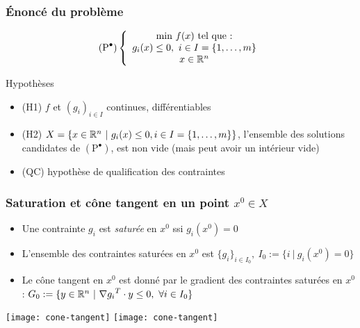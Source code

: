 \documentclass{beamer}
\newcommand{\R}{{\ensuremath\mathbb{R}}}
\begin{document}
\begin{frame}
  \frametitle{\'Enoncé du problème}

  \[
  (\text{P}^\bullet) \left\{
  \begin{array}{c}
    \text{min} \ f(x) \ \text{tel que :} \\
    g_i(x) \leq 0, \ i \in I = \{1, \dots, m\} \\
    x \in \R^n
  \end{array}
  \right.
  \]

  \begin{block}{Hypothèses}
    \begin{itemize}
    \item (H1) $f$ et $(g_i)_{i \in I}$ continues, différentiables
    \item (H2) $X = \{ x \in \R^n \ | \ g_i(x) \leq 0, i \in I = \{1, \dots, m\} \}$,
      l'ensemble des solutions candidates de $(\text{P}^\bullet)$, est non vide
      (mais peut avoir un intérieur vide)
    \item (QC) \alert{hypothèse de qualification des contraintes}
    \end{itemize}
  \end{block}
  
\end{frame}

\begin{frame}
  \frametitle{Saturation et cône tangent en un point $x^0 \in X$}

  \begin{itemize}
    \item Une contrainte $g_i$ est \emph{saturée} en $x^0$ ssi $g_i(x^0) = 0$
    \item L'ensemble des contraintes saturées en $x^0$ est
      $\{g_i\}_{i \in I_0}, \ I_0 := \{i \ | \ g_i(x^0) = 0 \}$
    \item Le cône tangent en $x^0$ est donné par le gradient des contraintes saturées en $x^0$ :
      $G_0 := \{ y \in \R^n \ | \ {\nabla g_i}^T \cdot y \leq 0, \ \forall i \in I_0 \}$ 
  \end{itemize}

  \begin{center}
      \texttt{[image: cone-tangent]} \hspace{0.01\textwidth}   
      \texttt{[image: cone-tangent]}    
  \end{center}
  
\end{frame}
\end{document}
